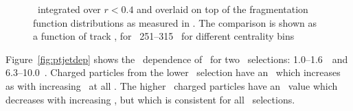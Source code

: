\begin{figure}
\caption{\Rdptr\ integrated over $ r < 0.4$ and overlaid on top of the fragmentation function distributions as measured in \cite{ATLAS502FFConf}. The comparison is shown as a function of track \pt, for \ptjet\ 251--315 \GeV\,  for different centrality bins }
\label{fig:FF_comparison_jet4}
\end{figure}


Figure~\ref{fig:ptjetdep} shows the \ptjet\ dependence of \RDptr\ for two \pt\ selections: 1.0--1.6~\GeV\ and
6.3--10.0~\GeV.  Charged particles from the lower \pt\ selection have an \RDptr\ which increases as 
with increasing \ptjet\ at all  \rvar.  The higher \pt\ charged particles
have an \RDptr\ value which decreases with increasing \rvar, but which is consistent for all \ptjet\ selections.



